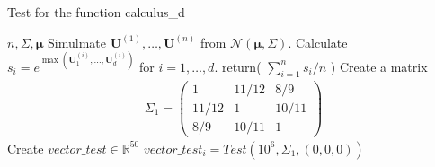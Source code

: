 \documentclass[
]{article}
\begin{document}
\begin{algorithm}[H]
\caption{Test for the function calculus\_d}
\begin{algorithmic}[1]
 {$n,\Sigma,\boldsymbol{\mu}$} 
\State Simulmate $\boldsymbol{U}^{(1)},\ldots,\boldsymbol{U}^{(n)}$ from $\mathcal{N}(\boldsymbol{\mu},\Sigma)$.
\State Calculate $s_i=e^{\max(\boldsymbol{U}^{(i)}_{1},\ldots,\boldsymbol{U}^{(i)}_{d} )}$ for $i=1,\ldots,d$. 
\State return( $\sum_{i=1}^{n} s_i/n$ )
\EndFunction
\State Create a matrix 
$$
\begin{aligned}
\Sigma_1=
\begin{pmatrix}
1 & 11/12 & 8/9\\
11/12 & 1 & 10/11 \\
8/9 & 10/11 & 1
\end{pmatrix}
\end{aligned}
$$
\State Create $vector\_test \in \mathbb{R}^{50}$
\State $vector\_test_i=Test(10^6,\Sigma_1,(0,0,0))$
\EndFor
\end{algorithmic}
\end{algorithm}
\end{document}
